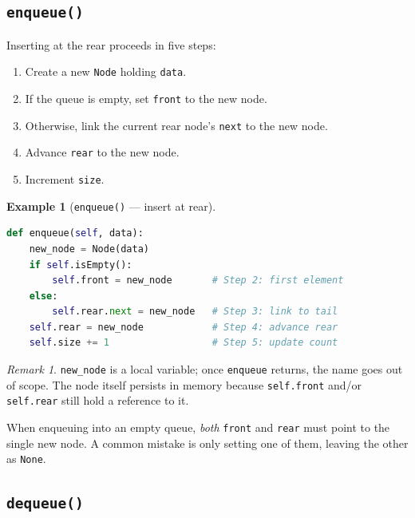 \documentclass[11pt, a4paper, notitlepage]{report}
\theoremstyle{definition}
\theoremstyle{remark}
\newtheorem{remark}[theorem]{Remark}
\theoremstyle{definition}
\newtheorem{example}[theorem]{Example}
\begin{document}
\subsection{\texttt{enqueue()}}
\label{subsec:queue-enqueue}

Inserting at the rear proceeds in five steps:

\begin{enumerate}
  \item Create a new \texttt{Node} holding \texttt{data}.
  \item If the queue is empty, set \texttt{front} to the new node.
  \item Otherwise, link the current rear node's \texttt{next} to the new node.
  \item Advance \texttt{rear} to the new node.
  \item Increment \texttt{size}.
\end{enumerate}

\begin{example}[\texttt{enqueue()} --- insert at rear]
\label{ex:queue-enqueue}
\leavevmode
\begin{lstlisting}[language=Python]
def enqueue(self, data):
    new_node = Node(data)
    if self.isEmpty():
        self.front = new_node       # Step 2: first element
    else:
        self.rear.next = new_node   # Step 3: link to tail
    self.rear = new_node            # Step 4: advance rear
    self.size += 1                  # Step 5: update count
\end{lstlisting}
\end{example}

\begin{remark}
\texttt{new\_node} is a local variable; once \texttt{enqueue} returns, the name goes out of
scope.  The node itself persists in memory because \texttt{self.front} and/or \texttt{self.rear}
still hold a reference to it.
\end{remark}

\begin{examtip}[title={Exam Tip: Empty-Queue Edge Case in \texttt{enqueue}}]
When enqueuing into an empty queue, \emph{both} \texttt{front} and \texttt{rear} must point to
the single new node.  A common mistake is only setting one of them, leaving the other as
\texttt{None}.
\end{examtip}

\subsection{\texttt{dequeue()}}
\label{subsec:queue-dequeue}
\end{document}
